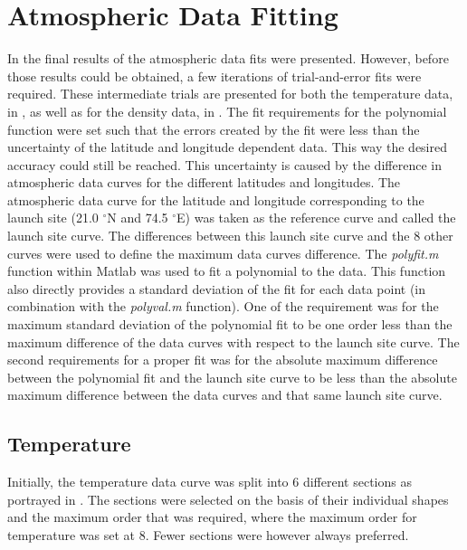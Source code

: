 \chapter{Atmospheric Data Fitting}
\label{app:appendixB-fittingProcessAndResults}
In  the final results of the atmospheric data fits were presented. However, before those results could be obtained, a few iterations of trial-and-error fits were required. These intermediate trials are presented for both the temperature data, in , as well as for the density data, in . The fit requirements for the polynomial function were set such that the errors created by the fit were less than the uncertainty of the latitude and longitude dependent data. This way the desired accuracy could still be reached. This uncertainty is caused by the difference in atmospheric data curves for the different latitudes and longitudes. The atmospheric data curve for the latitude and longitude corresponding to the launch site (21.0 $^\circ$N and 74.5 $^\circ$E) was taken as the reference curve and called the launch site curve. The differences between this launch site curve and the 8 other curves were used to define the maximum data curves difference. The \textit{polyfit.m} function within Matlab was used to fit a polynomial to the data. This function also directly provides a standard deviation of the fit for each data point (in combination with the \textit{polyval.m} function). One of the requirement was for the maximum standard deviation of the polynomial fit to be one order less than the maximum difference of the data curves with respect to the launch site curve. The second requirements for a proper fit was for the absolute maximum difference between the polynomial fit and the launch site curve to be less than the absolute maximum difference between the data curves and that same launch site curve. 


\section{Temperature}
\label{appsec:tempFit}
Initially, the temperature data curve was split into 6 different sections as portrayed in . The sections were selected on the basis of their individual shapes and the maximum order that was required, where the maximum order for temperature was set at 8. Fewer sections were however always preferred. 

